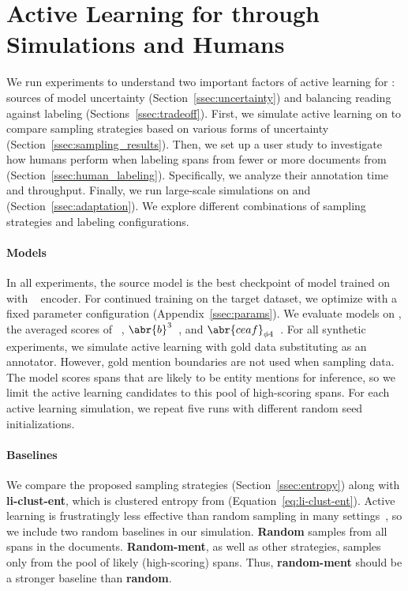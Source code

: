 
\section{Active Learning for \coref{} through Simulations and Humans}
\label{sec:experiments}

We run experiments to understand two important factors of active learning for
\coref{}: sources of model
uncertainty (Section~\ref{ssec:uncertainty}) and balancing reading against
labeling
(Sections~\ref{ssec:tradeoff}).
First, we simulate active learning on \preco{} to compare sampling strategies
based on various forms of uncertainty
(Section~\ref{ssec:sampling_results}).
Then, we set up a user study to investigate how humans perform when labeling
spans from fewer or more documents from \preco{} (Section~\ref{ssec:human_labeling}).
Specifically, we analyze their annotation time and throughput.
Finally, we run large-scale simulations on \preco{} and
\qbcoref{} (Section~\ref{ssec:adaptation}).
We explore different combinations of sampling strategies and labeling
configurations.

\paragraph{Models}
In all experiments, the source model is the best checkpoint of \icoref{} model
 trained on
\ontonotes{}~\citep{xia-2020}
with
\spanbertlarge~\citep{joshi-2020} encoder.
For continued training on the target dataset, we optimize with a fixed parameter
configuration (Appendix~\ref{ssec:params}).
We evaluate models on
\avgfone{}, the averaged \fone{} scores of ~\citep{vilain-1995}, $\abr{b}^3$~\citep{bagga-1998},
and $\abr{ceaf}_{\phi4}$~\citep{luo-2005}.
For all synthetic experiments, we simulate active learning with gold data
substituting as an annotator. However, gold mention boundaries are not used when
sampling data. The model scores spans that are likely to be entity
mentions for inference, so we limit the active learning candidates to this pool of high-scoring
spans.
For each active learning simulation, we repeat five runs with different random seed initializations.
\paragraph{Baselines}
We compare the proposed sampling strategies (Section~\ref{ssec:entropy})
along with \textbf{li-clust-ent}, which is
clustered entropy from \citet{li-2020} (Equation~\ref{eq:li-clust-ent}).
Active learning is frustratingly less effective than random sampling in many settings~\citep{lowell-2019}, so we include two random baselines in our
simulation. \textbf{Random} samples from all spans in the
documents. \textbf{Random-ment}, as well as other strategies, samples only from the
pool of likely (high-scoring) spans.
Thus, \textbf{random-ment} should be a stronger
baseline than \textbf{random}.

